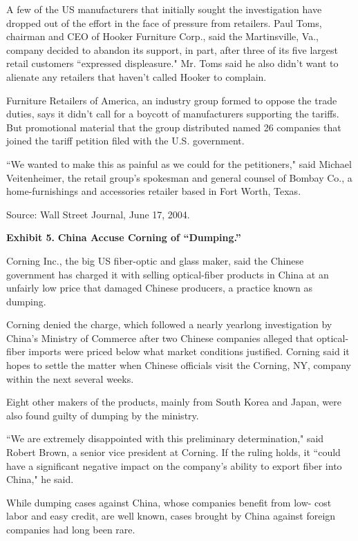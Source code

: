 \documentclass[letterpaper,12pt]{article}
\begin{document}
A few of the US manufacturers that initially sought the investigation have dropped out of the effort in the face of pressure from retailers. Paul Toms, chairman and CEO of Hooker Furniture Corp., said the Martinsville, Va., company decided to abandon its support, in part, after three of its five largest retail customers ``expressed displeasure." Mr. Toms said he also didn't want to alienate any retailers that haven't called Hooker to complain.

Furniture Retailers of America, an industry group formed to oppose the trade duties, says it didn't call for a boycott of manufacturers supporting the tariffs. But promotional material that the group distributed named 26 companies that joined the tariff petition filed with the U.S. government.

``We wanted to make this as painful as we could for the petitioners," said Michael Veitenheimer, the retail group's spokesman and general counsel of Bombay Co., a home-furnishings and accessories retailer based in Fort Worth, Texas.


Source:  Wall Street Journal, June 17, 2004.  


\pagebreak%
{\bf Exhibit 5.} {\bf China Accuse Corning of ``Dumping.''}  

Corning Inc., the big US fiber-optic and glass maker, said the Chinese government has charged it with selling optical-fiber products in China at an unfairly low price that damaged Chinese producers, a practice known as dumping.

Corning denied the charge, which followed a nearly yearlong investigation by China's Ministry of Commerce after two Chinese companies alleged that optical-fiber imports were priced below what market conditions justified. Corning said it hopes to settle the matter when Chinese officials visit the Corning, NY, company within the next several weeks.

Eight other makers of the products, mainly from South Korea and Japan, were also found guilty of dumping by the ministry.

``We are extremely disappointed with this preliminary determination," said Robert Brown, a senior vice president at Corning. If the ruling holds, it ``could have a significant negative impact on the company's ability to export fiber into China," he said.

While dumping cases against China, whose companies benefit from low- cost labor and easy credit, are well known, cases brought by China against foreign companies had long been rare.
\end{document}
